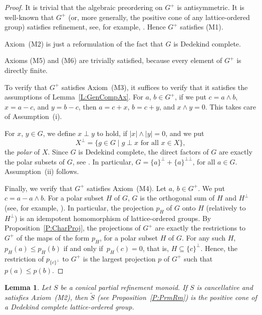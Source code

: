 \documentclass[psamsfonts,reqno]{memo-l}
\theoremstyle{plain}
\newtheorem{lemma}{Lemma}[section]
\theoremstyle{definition}
\theoremstyle{remark}
\numberwithin{equation}{section}
\renewcommand{\iff}{if and only if}
\newcommand{\Ref}[1]{\widetilde{#1}}
\newcommand{\pup}[1]{\textup{(}{#1}\textup{)}}
\newcommand{\prm}{partial refinement mon\-oid}
\newcommand{\set}[1]{\{#1\}}
\newcommand{\setm}[2]{\set{#1\mid#2}}
\begin{document}
\begin{proof}
It is trivial that the algebraic preordering on $G^+$ is antisymmetric.
It is well-known that $G^+$ (or, more generally, the positive cone
of any lattice-ordered group) satisfies refinement, see, for example,
%
\cite[Th\'eor\`eme~1.2.16]{BKW}. Hence $G^+$ satisfies (M1).

Axiom~(M2) is just a reformulation of the fact that $G$ is Dedekind complete.

Axioms (M5) and (M6) are trivially satisfied, because every element of $G^+$
is directly finite.

To verify that $G^+$ satisfies Axiom~(M3), it suffices to verify that it
satisfies the assumptions of Lemma~\ref{L:GenCompAx}. For $a$, $b\in G^+$,
if we put $c=a\wedge b$, $x=a-c$, and $y=b-c$, then $a=c+x$, $b=c+y$, and
$x\wedge y=0$. This takes care of Assumption~(i).

For $x$, $y\in G$, we define $x\perp y$ to hold, if $|x|\wedge|y|=0$, and we
put
   \[
   X^\bot=\setm{g\in G}{g\perp x\text{ for all }x\in X},
   \]
the \emph{polar} of $X$. Since $G$ is Dedekind
complete, the direct factors of $G$ are exactly the polar subsets of $G$, see
%
\cite[Th\'eor\`eme~11.2.4]{BKW}. In particular,
$G=\set{a}^\bot+\set{a}^{\bot\bot}$, for all
$a\in G$. Assumption~(ii) follows.

Finally, we verify that $G^+$ satisfies Axiom~(M4). Let $a$, $b\in G^+$. We
put $c=a-a\wedge b$. For a polar subset $H$
of $G$, $G$ is the orthogonal sum of $H$ and $H^\bot$ (see, for example,
\cite[Theorem~27]{Birk}). In  particular, the
projection $p_H$ of $G$ onto
$H$ (relatively to $H^\bot$) is an idempotent homomorphism of
lattice-ordered groups. By Proposition~\ref{P:CharProj}, the projections of
$G^+$ are exactly the restrictions to $G^+$ of the maps of the form $p_H$,
for a polar subset $H$ of $G$. For any such $H$, $p_H(a)\leq p_H(b)$ \iff\
$p_H(c)=0$, that is, $H\subseteq\set{c}^\bot$. Hence, the restriction of
$p_{\set{c}^\bot}$ to $G^+$ is the largest projection $p$ of $G^+$ such that
$p(a)\leq p(b)$.
\end{proof}

\begin{lemma}\label{L:RefSM1}
Let $S$ be a conical \prm. If $S$ is cancellative and
satisfies Axiom~\textup{(M2)}, then $\Ref S$ \pup{see
Proposition~\textup{\ref{P:PrmRm}}} is the positive cone of a Dedekind
complete lattice-ordered group.
\end{lemma}
\end{document}
